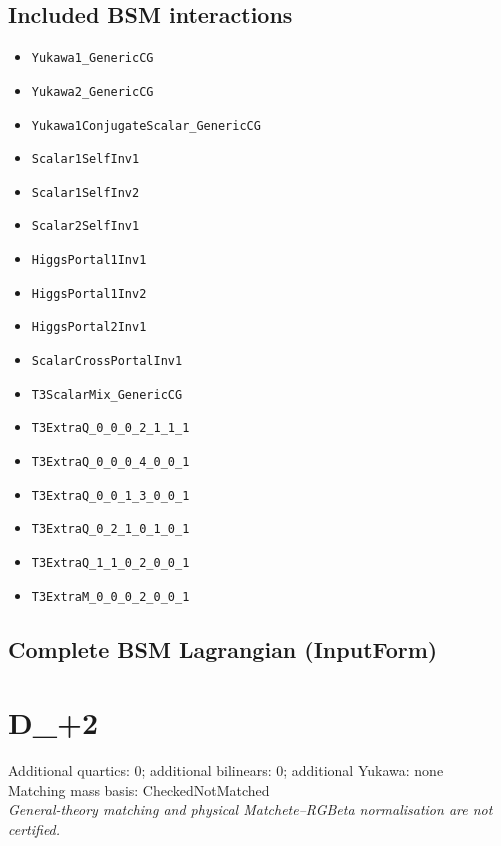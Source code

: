 \documentclass[10pt,a4paper]{article}
\begin{document}
\subsection*{Included BSM interactions}
\begin{itemize}
\item \texttt{Yukawa1\_GenericCG}
\item \texttt{Yukawa2\_GenericCG}
\item \texttt{Yukawa1ConjugateScalar\_GenericCG}
\item \texttt{Scalar1SelfInv1}
\item \texttt{Scalar1SelfInv2}
\item \texttt{Scalar2SelfInv1}
\item \texttt{HiggsPortal1Inv1}
\item \texttt{HiggsPortal1Inv2}
\item \texttt{HiggsPortal2Inv1}
\item \texttt{ScalarCrossPortalInv1}
\item \texttt{T3ScalarMix\_GenericCG}
\item \texttt{T3ExtraQ\_0\_0\_0\_2\_1\_1\_1}
\item \texttt{T3ExtraQ\_0\_0\_0\_4\_0\_0\_1}
\item \texttt{T3ExtraQ\_0\_0\_1\_3\_0\_0\_1}
\item \texttt{T3ExtraQ\_0\_2\_1\_0\_1\_0\_1}
\item \texttt{T3ExtraQ\_1\_1\_0\_2\_0\_0\_1}
\item \texttt{T3ExtraM\_0\_0\_0\_2\_0\_0\_1}
\end{itemize}
\subsection*{Complete BSM Lagrangian (InputForm)}

\clearpage
\section{D\_+2}
Additional quartics: 0; additional bilinears: 0; additional Yukawa: none\\
Matching mass basis: CheckedNotMatched\\
\emph{General-theory matching and physical Matchete--RGBeta normalisation are not certified.}
\end{document}
